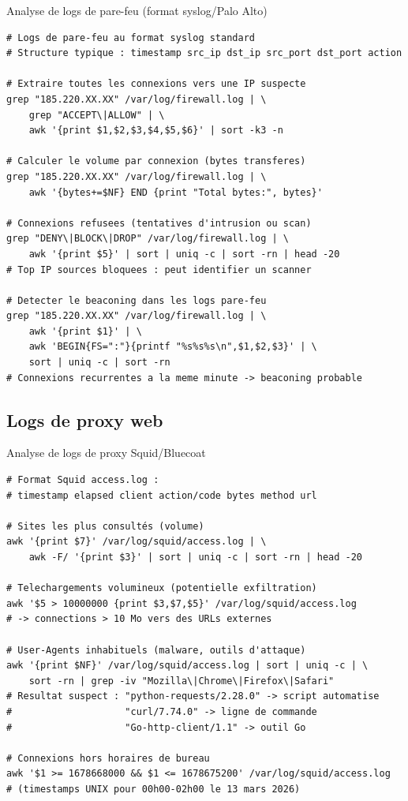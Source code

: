 \begin{boxoutils}{Analyse de logs de pare-feu (format syslog/Palo Alto)}
\begin{lstlisting}[language=bash_forensique]
# Logs de pare-feu au format syslog standard
# Structure typique : timestamp src_ip dst_ip src_port dst_port action

# Extraire toutes les connexions vers une IP suspecte
grep "185.220.XX.XX" /var/log/firewall.log | \
    grep "ACCEPT\|ALLOW" | \
    awk '{print $1,$2,$3,$4,$5,$6}' | sort -k3 -n

# Calculer le volume par connexion (bytes transferes)
grep "185.220.XX.XX" /var/log/firewall.log | \
    awk '{bytes+=$NF} END {print "Total bytes:", bytes}'

# Connexions refusees (tentatives d'intrusion ou scan)
grep "DENY\|BLOCK\|DROP" /var/log/firewall.log | \
    awk '{print $5}' | sort | uniq -c | sort -rn | head -20
# Top IP sources bloquees : peut identifier un scanner

# Detecter le beaconing dans les logs pare-feu
grep "185.220.XX.XX" /var/log/firewall.log | \
    awk '{print $1}' | \
    awk 'BEGIN{FS=":"}{printf "%s%s%s\n",$1,$2,$3}' | \
    sort | uniq -c | sort -rn
# Connexions recurrentes a la meme minute -> beaconing probable
\end{lstlisting}
\end{boxoutils}

\subsection{Logs de proxy web}

\begin{boxoutils}{Analyse de logs de proxy Squid/Bluecoat}
\begin{lstlisting}[language=bash_forensique]
# Format Squid access.log :
# timestamp elapsed client action/code bytes method url

# Sites les plus consultés (volume)
awk '{print $7}' /var/log/squid/access.log | \
    awk -F/ '{print $3}' | sort | uniq -c | sort -rn | head -20

# Telechargements volumineux (potentielle exfiltration)
awk '$5 > 10000000 {print $3,$7,$5}' /var/log/squid/access.log
# -> connections > 10 Mo vers des URLs externes

# User-Agents inhabituels (malware, outils d'attaque)
awk '{print $NF}' /var/log/squid/access.log | sort | uniq -c | \
    sort -rn | grep -iv "Mozilla\|Chrome\|Firefox\|Safari"
# Resultat suspect : "python-requests/2.28.0" -> script automatise
#                    "curl/7.74.0" -> ligne de commande
#                    "Go-http-client/1.1" -> outil Go

# Connexions hors horaires de bureau
awk '$1 >= 1678668000 && $1 <= 1678675200' /var/log/squid/access.log
# (timestamps UNIX pour 00h00-02h00 le 13 mars 2026)
\end{lstlisting}
\end{boxoutils}

